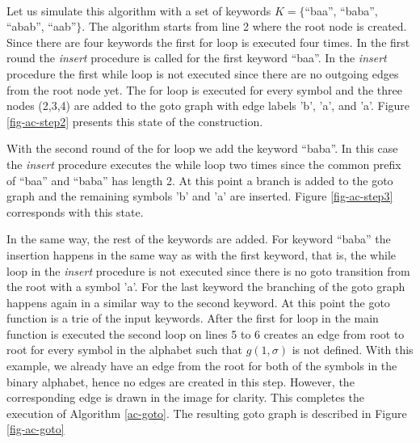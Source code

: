 \documentclass[english,twoside,censored,csm,algorithms-track-2020]{HYthesisML}
\theoremstyle{plain}
\theoremstyle{definition}
\newcounter{testexample}
\numberwithin{testexample}{chapter}
\begin{document}
  \begin{testexample}[]~\label{exmp-goto}\\
  Let us simulate this algorithm with a set of keywords $K=\{$``baa'', ``baba'', ``abab'', ``aab''$\}$.
  The algorithm starts from line 2 where the root node is created.
  Since there are four keywords the first for loop is executed four times.
  In the first round the \textit{insert} procedure is called for the first keyword ``baa''.
  In the \textit{insert} procedure the first while loop is not executed since there are no
  outgoing edges from the root node yet. The for loop is executed for every symbol and the three
  nodes (2,3,4) are added to the goto graph with edge labels 'b', 'a', and 'a'.
  Figure \ref{fig-ac-step2} presents this state of the construction.




  With the second round of the for loop we add the keyword ``baba''. In this case the \textit{insert}
  procedure executes the while loop two times since the common prefix of ``baa'' and ``baba'' has length
  2. At this point a branch is added to the goto graph
  and the remaining symbols 'b' and 'a' are inserted.
  Figure \ref{fig-ac-step3} corresponds with this state.



  In the same way, the rest of the keywords are added. For keyword ``baba'' the insertion
  happens in the same way as with the first keyword, that is, the while loop in the \textit{insert}
  procedure is not executed since there is no goto transition from the root with a symbol 'a'.
  For the last keyword the branching of the goto graph happens again
  in a similar way to the second keyword. At this point the goto function is a trie of the
  input keywords. After the first for loop in the main function is executed
  the second loop on lines 5 to 6 creates an edge from root to root for every symbol in the
  alphabet such that $g(1,\sigma)$ is not defined. With this example, we already have an edge from the
  root for both of the symbols in the binary alphabet, hence no edges are created in this step.
  However, the corresponding edge is drawn in the image for clarity. This completes the execution of
  Algorithm \ref{ac-goto}.
  The resulting goto graph is described in Figure \ref{fig-ac-goto}

  \end{testexample}
\end{document}
